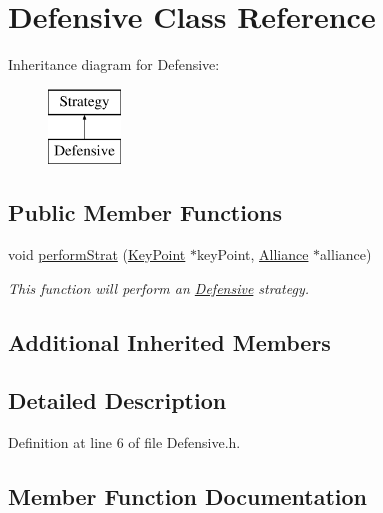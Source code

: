 \hypertarget{classDefensive}{}\section{Defensive Class Reference}
\label{classDefensive}
Inheritance diagram for Defensive\+:\begin{figure}[H]
\begin{center}
\leavevmode
\includegraphics[height=2.000000cm]{classDefensive}
\end{center}
\end{figure}
\subsection*{Public Member Functions}
\begin{DoxyCompactItemize}
\item 
void \hyperlink{classDefensive_a4cc4f2f71160bcade2cf2be8ade39903}{perform\+Strat} (\hyperlink{classKeyPoint}{Key\+Point} $\ast$key\+Point, \hyperlink{classAlliance}{Alliance} $\ast$alliance)
\begin{DoxyCompactList}\small\item\em This function will perform an \hyperlink{classDefensive}{Defensive} strategy. \end{DoxyCompactList}\end{DoxyCompactItemize}
\subsection*{Additional Inherited Members}


\subsection{Detailed Description}


Definition at line 6 of file Defensive.\+h.



\subsection{Member Function Documentation}
\mbox{\label{classDefensive_a4cc4f2f71160bcade2cf2be8ade39903}} 
